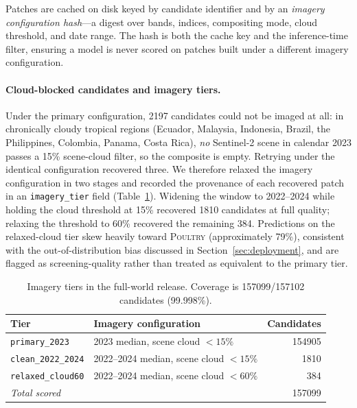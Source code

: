 \documentclass[11pt,a4paper]{article}
\newcommand{\code}[1]{\texttt{\small #1}}
\begin{document}
Patches are cached on disk keyed by candidate identifier and by an
\emph{imagery configuration hash}---a digest over bands, indices, compositing
mode, cloud threshold, and date range. The hash is both the cache key and the
inference-time filter, ensuring a model is never scored on patches built under a
different imagery configuration.

\paragraph{Cloud-blocked candidates and imagery tiers.}
Under the primary configuration, \num{2197} candidates could not be imaged at
all: in chronically cloudy tropical regions (Ecuador, Malaysia, Indonesia,
Brazil, the Philippines, Colombia, Panama, Costa Rica), \emph{no} Sentinel-2
scene in calendar 2023 passes a 15\% scene-cloud filter, so the composite is
empty. Retrying under the identical configuration recovered three. We therefore
relaxed the imagery configuration in two stages and recorded the provenance of
each recovered patch in an \code{imagery\_tier} field
(Table~\ref{tab:tiers}). Widening the window to 2022--2024 while holding the
cloud threshold at 15\% recovered \num{1810} candidates at full quality; relaxing
the threshold to 60\% recovered the remaining 384. Predictions on the
relaxed-cloud tier skew heavily toward \textsc{Poultry} (approximately 79\%),
consistent with the out-of-distribution bias discussed in
Section~\ref{sec:deployment}, and are flagged as screening-quality rather than
treated as equivalent to the primary tier.

\begin{table}[t]
\centering
\small
\caption{Imagery tiers in the full-world release. Coverage is
\num{157099}/\num{157102} candidates (99.998\%).}
\label{tab:tiers}
\begin{tabular}{llr}
\toprule
Tier & Imagery configuration & Candidates \\
\midrule
\code{primary\_2023}      & 2023 median, scene cloud $<15\%$      & \num{154905} \\
\code{clean\_2022\_2024}  & 2022--2024 median, scene cloud $<15\%$ & \num{1810}   \\
\code{relaxed\_cloud60}   & 2022--2024 median, scene cloud $<60\%$ & 384          \\
\midrule
\multicolumn{2}{l}{\textit{Total scored}} & \num{157099} \\
\bottomrule
\end{tabular}
\end{table}
\end{document}
